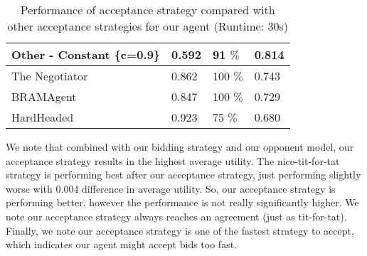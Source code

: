 \begin{table}
\begin{tabular}{l|lll}
Other - Constant \{c=0.9\}    & 0.592                                                                 & 91 $\%$                                                              & 0.814                                                       \\ \hline
The Negotiator                & 0.862                                                                 & 100  $\%$                                                            & 0.743                                                       \\ \hline
BRAMAgent                     & 0.847                                                                 & 100 $\%$                                                             & 0.729                                                       \\ \hline
HardHeaded                    & 0.923                                                                 & 75 $\%$                                                              & 0.680                                                      
\end{tabular}
\caption{Performance of acceptance strategy compared with other acceptance strategies for our agent (Runtime: $30$s) \label{table:as-results}}
\end{table}

We note that combined with our bidding strategy and our opponent model, our acceptance strategy results in the highest average utility.
The nice-tit-for-tat strategy is performing best after our acceptance strategy, just performing slightly worse with $0.004$ difference in average utility.
So, our acceptance strategy is performing better, however the performance is not really significantly higher.
We note our acceptance strategy always reaches an agreement (just as tit-for-tat).
Finally, we note our acceptance strategy is one of the fastest strategy to accept, which indicates our agent might accept bids too fast.

